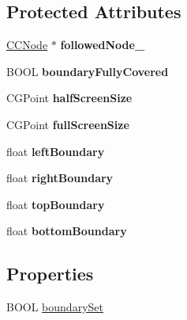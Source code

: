 \subsection*{Protected Attributes}
\begin{DoxyCompactItemize}
\item 
\hypertarget{interface_c_c_follow_ae43821a33173744db154c09f9658028f}{\hyperlink{class_c_c_node}{C\-C\-Node} $\ast$ {\bfseries followed\-Node\-\_\-}}\label{interface_c_c_follow_ae43821a33173744db154c09f9658028f}

\item 
\hypertarget{interface_c_c_follow_a9c8ad8b15485a739a657604aa3699974}{B\-O\-O\-L {\bfseries boundary\-Fully\-Covered}}\label{interface_c_c_follow_a9c8ad8b15485a739a657604aa3699974}

\item 
\hypertarget{interface_c_c_follow_aed502a2e5fe6d2a11eb281242aee70f1}{C\-G\-Point {\bfseries half\-Screen\-Size}}\label{interface_c_c_follow_aed502a2e5fe6d2a11eb281242aee70f1}

\item 
\hypertarget{interface_c_c_follow_a8c666a0f9b42d848b244e9494dddadf1}{C\-G\-Point {\bfseries full\-Screen\-Size}}\label{interface_c_c_follow_a8c666a0f9b42d848b244e9494dddadf1}

\item 
\hypertarget{interface_c_c_follow_a0afe2aea3a0fe017812e20d628e4766c}{float {\bfseries left\-Boundary}}\label{interface_c_c_follow_a0afe2aea3a0fe017812e20d628e4766c}

\item 
\hypertarget{interface_c_c_follow_a052c8688d8514db767680fc85a22aff4}{float {\bfseries right\-Boundary}}\label{interface_c_c_follow_a052c8688d8514db767680fc85a22aff4}

\item 
\hypertarget{interface_c_c_follow_ae31fc04f9746b6224b3bfddaa0f48721}{float {\bfseries top\-Boundary}}\label{interface_c_c_follow_ae31fc04f9746b6224b3bfddaa0f48721}

\item 
\hypertarget{interface_c_c_follow_ab064431de84b5714079b8497947905be}{float {\bfseries bottom\-Boundary}}\label{interface_c_c_follow_ab064431de84b5714079b8497947905be}

\end{DoxyCompactItemize}
\subsection*{Properties}
\begin{DoxyCompactItemize}
\item 
B\-O\-O\-L \hyperlink{interface_c_c_follow_a2e8c9c693c6996f161a091b1dd6bf144}{boundary\-Set}
\end{DoxyCompactItemize}


